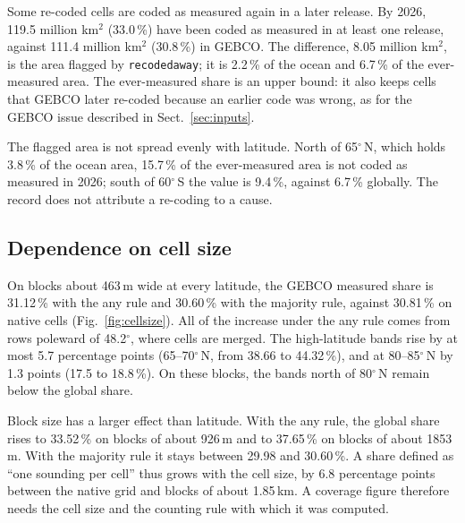\documentclass[essd, manuscript]{copernicus}
\renewcommand{\_}{\usorig\allowbreak}
\begin{document}
Some re-coded cells are coded as measured again in a later release.
By 2026, 119.5 million km$^2$ (33.0\,\%) have been coded as measured in at least one release, against 111.4 million km$^2$ (30.8\,\%) in GEBCO\_2026.
The difference, 8.05 million km$^2$, is the area flagged by \texttt{recoded\_away}; it is 2.2\,\% of the ocean and 6.7\,\% of the ever-measured area.
The ever-measured share is an upper bound: it also keeps cells that GEBCO later re-coded because an earlier code was wrong, as for the GEBCO\_2023 issue described in Sect.~\ref{sec:inputs}.

The flagged area is not spread evenly with latitude.
North of 65$^\circ$\,N, which holds 3.8\,\% of the ocean area, 15.7\,\% of the ever-measured area is not coded as measured in 2026; south of 60$^\circ$\,S the value is 9.4\,\%, against 6.7\,\% globally.
The record does not attribute a re-coding to a cause.

\subsection{Dependence on cell size}
\label{sec:cellsize}

On blocks about 463\,m wide at every latitude, the GEBCO\_2026 measured share is 31.12\,\% with the any rule and 30.60\,\% with the majority rule, against 30.81\,\% on native cells (Fig.~\ref{fig:cellsize}).
All of the increase under the any rule comes from rows poleward of 48.2$^\circ$, where cells are merged.
The high-latitude bands rise by at most 5.7 percentage points (65--70$^\circ$\,N, from 38.66 to 44.32\,\%), and at 80--85$^\circ$\,N by 1.3 points (17.5 to 18.8\,\%).
On these blocks, the bands north of 80$^\circ$\,N remain below the global share.

Block size has a larger effect than latitude.
With the any rule, the global share rises to 33.52\,\% on blocks of about 926\,m and to 37.65\,\% on blocks of about 1853\,m.
With the majority rule it stays between 29.98 and 30.60\,\%.
A share defined as ``one sounding per cell'' thus grows with the cell size, by 6.8 percentage points between the native grid and blocks of about 1.85\,km.
A coverage figure therefore needs the cell size and the counting rule with which it was computed.
\end{document}
